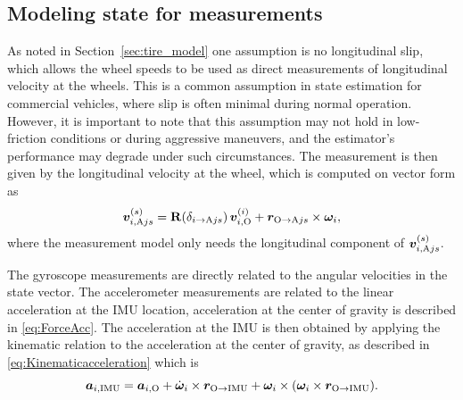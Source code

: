 \documentclass[conference]{IEEEtran}
\begin{document}
\subsection{Modeling state for measurements}
As noted in Section~\ref{sec:tire_model} one assumption is no longitudinal slip, which allows the wheel speeds to be used as direct measurements of longitudinal velocity at the wheels. This is a common assumption in state estimation for commercial vehicles, where slip is often minimal during normal operation. However, it is important to note that this assumption may not hold in low-friction conditions or during aggressive maneuvers, and the estimator's performance may degrade under such circumstances. The measurement is then given by the longitudinal velocity at the wheel, which is computed on vector form as
\begin{equation}
    \bm{v}^{(s)}_{i,\text{A} j s} = \mathbf{R}(\delta_{i\to\text{A} j s})\,\bm v^{(i)}_{i,\text{O}}+\bm{r}_{\text{O}\to \text{A} j s} \times \bm{\omega}_i,
\end{equation}
where the measurement model only needs the longitudinal component of $\bm{v}^{(s)}_{i,\text{A} j s}$. 

The gyroscope measurements are directly related to the angular velocities in the state vector. The accelerometer measurements are related to the linear acceleration at the IMU location, acceleration at the center of gravity is described in \ref{eq:ForceAcc}. The acceleration at the IMU is then obtained by applying the kinematic relation to the acceleration at the center of gravity, as described in \ref{eq:Kinematicacceleration} which is
\begin{equation}
    \bm a_{i,\text{IMU}} = \bm a_{i,\text{O}} + \dot{\bm\omega}_i \times \bm r_{\text{O}\to \text{IMU}} + \bm\omega_i \times (\bm\omega_i \times \bm r_{\text{O}\to \text{IMU}}).
\end{equation}
\end{document}
